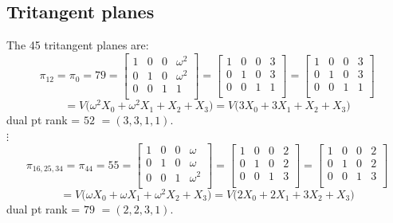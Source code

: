 \subsection*{Tritangent planes}
The 45 tritangent planes are:\\
$$
\pi_{12} = \pi_{0} = 79 = \left[
\begin{array}{*{4}{r}}
1 & 0 & 0 & \omega^{2}\\
0 & 1 & 0 & \omega^{2}\\
0 & 0 & 1 & 1\\
\end{array}
\right]
 = \left[
\begin{array}{*{4}{r}}
1 & 0 & 0 & 3\\
0 & 1 & 0 & 3\\
0 & 0 & 1 & 1\\
\end{array}
\right]
 = \left[
\begin{array}{*{4}{r}}
1 & 0 & 0 & 3\\
0 & 1 & 0 & 3\\
0 & 0 & 1 & 1\\
\end{array}
\right]
$$
$$
=V\big(
\omega^{2}X_0 + \omega^{2}X_1 + X_2 + X_3\big)
=V\big(
3X_0 + 3X_1 + X_2 + X_3\big)
$$
dual pt rank = $52$ $=( 3, 3, 1, 1 )$.\\
$\vdots$\\
$$
\pi_{16,25,34} = \pi_{44} = 55 = \left[
\begin{array}{*{4}{r}}
1 & 0 & 0 & \omega \\
0 & 1 & 0 & \omega \\
0 & 0 & 1 & \omega^{2}\\
\end{array}
\right]
 = \left[
\begin{array}{*{4}{r}}
1 & 0 & 0 & 2\\
0 & 1 & 0 & 2\\
0 & 0 & 1 & 3\\
\end{array}
\right]
 = \left[
\begin{array}{*{4}{r}}
1 & 0 & 0 & 2\\
0 & 1 & 0 & 2\\
0 & 0 & 1 & 3\\
\end{array}
\right]
$$
$$
=V\big(
\omega X_0 + \omega X_1 + \omega^{2}X_2 + X_3\big)
=V\big(
2X_0 + 2X_1 + 3X_2 + X_3\big)
$$
dual pt rank = $79$ $=( 2, 2, 3, 1 )$.\\
